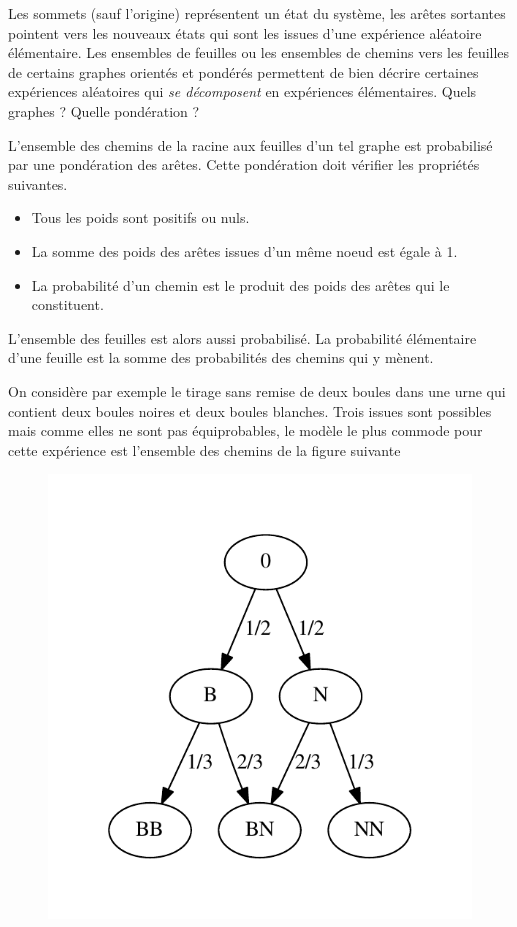 Les sommets (sauf l'origine) représentent un état du système, les arêtes sortantes pointent vers les nouveaux états qui sont les issues d'une expérience aléatoire élémentaire.  Les ensembles de feuilles ou les ensembles de chemins vers les feuilles de certains graphes orientés et pondérés permettent de bien décrire certaines expériences aléatoires qui \emph{se décomposent} en expériences élémentaires.
Quels graphes ? Quelle pondération ?
\begin{defi}
  L'ensemble des chemins de la racine aux feuilles d'un tel graphe est probabilisé par une pondération des arêtes. Cette pondération doit vérifier les propriétés suivantes.
\begin{itemize}
  \item Tous les poids sont positifs ou nuls.
  \item La somme des poids des arêtes issues d'un même noeud est égale à 1.
  \item La probabilité d'un chemin est le produit des poids des arêtes qui le constituent.
\end{itemize}
 L'ensemble des feuilles est alors aussi probabilisé. La probabilité élémentaire d'une feuille est la somme des probabilités des chemins qui y mènent.
\end{defi}
\clearpage
On considère par exemple le tirage sans remise de deux boules dans une urne qui contient deux boules noires et deux boules blanches. Trois issues sont possibles mais comme elles ne sont pas équiprobables, le modèle le plus commode pour cette expérience est l'ensemble des chemins de la figure suivante
\begin{figure}[h!]
 \centering
 \includegraphics{./C9646_1.pdf}
\end{figure}
